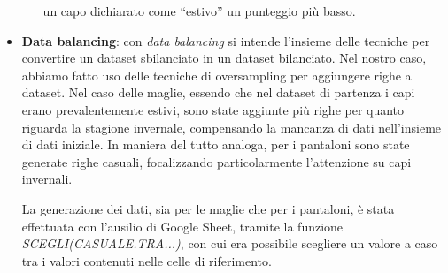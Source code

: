 \documentclass[a4paper, 11pt, oneside]{report}
\begin{document}
\begin{itemize}
\begin{itemize}
                        un capo dichiarato come ``estivo'' un punteggio più basso.
                    \end{itemize}
                    \item \textbf{Data balancing}: con \textit{data balancing} si intende l'insieme delle tecniche per convertire un dataset sbilanciato in un
                    dataset bilanciato. Nel nostro caso, abbiamo fatto uso delle tecniche di oversampling per aggiungere righe al dataset.
                    Nel caso delle maglie, essendo che nel dataset di partenza i capi erano prevalentemente estivi, sono state aggiunte più righe per quanto riguarda
                    la stagione invernale, compensando la mancanza di dati nell'insieme di dati iniziale. In maniera del tutto analoga, per i pantaloni sono state
                    generate righe casuali, focalizzando particolarmente l'attenzione su capi invernali.
                    \par \noindent La generazione dei dati, sia per le maglie che per i pantaloni,
                    è stata effettuata con l'ausilio di Google Sheet, tramite la funzione \textit{SCEGLI(CASUALE.TRA...)}, con cui era possibile scegliere un valore a caso
                    tra i valori contenuti nelle celle di riferimento.
                \end{itemize}
                \newpage
\end{document}
